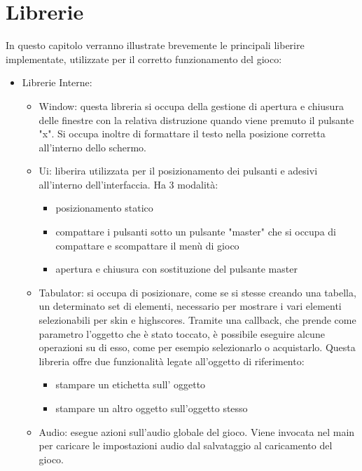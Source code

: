 \documentclass[12pt]{article}
\begin{document}
\section{Librerie}
In questo capitolo verranno illustrate brevemente le principali liberire implementate, utilizzate per il corretto funzionamento del gioco:\\
\begin{itemize}
    \item Librerie Interne: 
    \begin{itemize}
        \item Window: questa libreria si occupa della gestione di apertura e chiusura delle finestre con la relativa distruzione quando viene premuto il pulsante "x". Si occupa inoltre di formattare il testo nella posizione corretta all'interno dello schermo.
         \item Ui: liberira utilizzata per il posizionamento dei pulsanti e adesivi all'interno dell'interfaccia. Ha 3 modalità:
            \begin{itemize}
                \item posizionamento statico 
                \item compattare i pulsanti sotto un pulsante "master" che si occupa di compattare e scompattare il menù di gioco
                \item apertura e chiusura con sostituzione del pulsante master
            \end{itemize}
        \item Tabulator: si occupa di posizionare, come se si stesse creando una tabella, un determinato set di elementi, necessario per mostrare i vari elementi selezionabili per skin e highscores. Tramite una callback, che prende come parametro l'oggetto che è stato toccato, è possibile eseguire alcune operazioni su di esso, come per esempio selezionarlo o acquistarlo. Questa libreria offre due funzionalità legate all'oggetto di riferimento:
        \begin{itemize}
            \item stampare un etichetta sull’ oggetto
            \item stampare un altro oggetto sull'oggetto stesso
        \end{itemize}
         \item Audio: esegue azioni sull'audio globale del gioco. Viene invocata nel main per caricare le impostazioni audio dal salvataggio al caricamento del gioco.
         
    \end{itemize}
    

\end{itemize}
\end{document}
